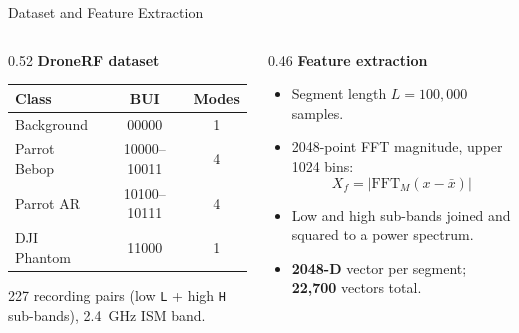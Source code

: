 \documentclass[aspectratio=169,11pt]{beamer}
\begin{document}
\begin{frame}{Dataset and Feature Extraction}
\begin{columns}[t]
\begin{column}{0.52\textwidth}
\textbf{DroneRF dataset}
\vspace{0.15cm}

\scriptsize
\begin{tabular}{|l|c|c|}
\hline
\textbf{Class} & \textbf{BUI} & \textbf{Modes} \\
\hline
Background & 00000 & 1 \\
\hline
Parrot Bebop & 10000--10011 & 4 \\
\hline
Parrot AR & 10100--10111 & 4 \\
\hline
DJI Phantom & 11000 & 1 \\
\hline
\end{tabular}
\vspace{0.2cm}

\footnotesize 227 recording pairs (low \texttt{L} + high \texttt{H} sub-bands),
2.4~GHz ISM band.
\end{column}
\begin{column}{0.46\textwidth}
\textbf{Feature extraction}
\begin{itemize}\footnotesize
\item Segment length $L = 100{,}000$ samples.
\item 2048-point FFT magnitude, upper 1024 bins:
\[\scriptstyle
X_f = \big|\mathrm{FFT}_M(x-\bar{x})\big|
\]
\item Low and high sub-bands joined and squared to a power spectrum.
\item \textbf{2048-D} vector per segment; \textbf{22{,}700} vectors total.
\end{itemize}
\end{column}
\end{columns}
\end{frame}
\end{document}
